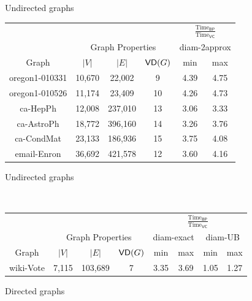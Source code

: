 \begin{figure}
  \centering
  \begin{subtable}[b]{0.47\textwidth}
	\ifdmkd
	  \caption{Undirected graphs}
	  \label{tab:expUndir}
	\fi
  \begin{small}
    \begin{tabular}{cccccc}
      \toprule
      &  & & &  \multicolumn{2}{c}{$\frac{\mbox{Time}_\mathsf{BP}}{\mbox{Time}_\mathsf{VC}}$} \\
      \cmidrule(r){5-6}
      & \multicolumn{3}{c}{Graph Properties} & \multicolumn{2}{c}{diam-2approx} \\
      \cmidrule(r){2-4} \cmidrule(r){5-6}
      Graph & $|V|$ & $|E|$ & $\mathsf{VD}(G)$ & min & max \\
      \midrule
      oregon1-010331 & 10,670 & 22,002 & 9 & 4.39 & 4.75\\  %
      oregon1-010526 & 11,174 & 23,409 & 10 & 4.26 & 4.73 \\
      ca-HepPh & 12,008 & 237,010 & 13 & 3.06 & 3.33\\
      ca-AstroPh & 18,772 & 396,160  & 14 & 3.26 & 3.76\\
      ca-CondMat & 23,133 & 186,936 & 15 & 3.75 & 4.08\\
      email-Enron & 36,692 & 421,578 & 12 & 3.60 & 4.16\\
      \bottomrule
    \end{tabular}
  \end{small}
  \ifdmkd
  \else
  \caption{Undirected graphs}
  \label{tab:expUndir}
  \fi
  \end{subtable}
\ifproof
\\
\else
\hspace{-5pt}
\fi
  \begin{subtable}[b]{0.47\textwidth}
	\ifdmkd
	\caption{Directed graphs}
	\label{tab:expDir}
	\fi
  \begin{small}
    \begin{tabular}{cccccccc}
      \toprule
      & & & & \multicolumn{4}{c}{$\frac{\mbox{Time}_\mathsf{BP}}{\mbox{Time}_\mathsf{VC}}$} \\
      \cmidrule(r){5-8}
      & \multicolumn{3}{c}{Graph Properties} & \multicolumn{2}{c}{diam-exact} &
      \multicolumn{2}{c}{diam-UB} \\
      \cmidrule(r){2-4} \cmidrule(r){5-6} \cmidrule(r){7-8}
      Graph & $|V|$ & $|E|$ & $\mathsf{VD}(G)$ & min & max & min & max \\
      \midrule
      wiki-Vote & 7,115 & 103,689  & 7 & 3.35 & 3.69 & 1.05 & 1.27 \\

\end{tabular}
\end{small}
\end{subtable}
\end{figure}
